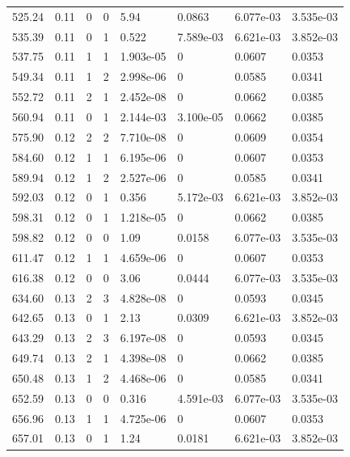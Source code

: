 \documentclass[preview]{standalone}
\begin{document}
{{{\begin{tabular}{L{1.2cm}C{1.2cm} C{0.3cm}C{0.5cm} C{1.4cm}C{1.4cm} C{1.4cm}C{1.4cm}}
  525.24  &  0.11  & 0     &  0 &  5.94  & 0.0863  & 6.077e-03 &  3.535e-03   \\ 
  535.39  &  0.11  & 0     &  1 &  0.522  & 7.589e-03  & 6.621e-03 &  3.852e-03   \\ 
  537.75  &  0.11  & 1     &  1 &  1.903e-05  & 0  & 0.0607 &  0.0353   \\ 
  549.34  &  0.11  & 1     &  2 &  2.998e-06  & 0  & 0.0585 &  0.0341   \\ 
  552.72  &  0.11  & 2     &  1 &  2.452e-08  & 0  & 0.0662 &  0.0385   \\ 
  560.94  &  0.11  & 0     &  1 &  2.144e-03  & 3.100e-05  & 0.0662 &  0.0385   \\ 
  575.90  &  0.12  & 2     &  2 &  7.710e-08  & 0  & 0.0609 &  0.0354   \\ 
  584.60  &  0.12  & 1     &  1 &  6.195e-06  & 0  & 0.0607 &  0.0353   \\ 
  589.94  &  0.12  & 1     &  2 &  2.527e-06  & 0  & 0.0585 &  0.0341   \\ 
  592.03  &  0.12  & 0     &  1 &  0.356  & 5.172e-03  & 6.621e-03 &  3.852e-03   \\ 
  598.31  &  0.12  & 0     &  1 &  1.218e-05  & 0  & 0.0662 &  0.0385   \\ 
  598.82  &  0.12  & 0     &  0 &  1.09  & 0.0158  & 6.077e-03 &  3.535e-03   \\ 
  611.47  &  0.12  & 1     &  1 &  4.659e-06  & 0  & 0.0607 &  0.0353   \\ 
  616.38  &  0.12  & 0     &  0 &  3.06  & 0.0444  & 6.077e-03 &  3.535e-03   \\ 
  634.60  &  0.13  & 2     &  3 &  4.828e-08  & 0  & 0.0593 &  0.0345   \\ 
  642.65  &  0.13  & 0     &  1 &  2.13  & 0.0309  & 6.621e-03 &  3.852e-03   \\ 
  643.29  &  0.13  & 2     &  3 &  6.197e-08  & 0  & 0.0593 &  0.0345   \\ 
  649.74  &  0.13  & 2     &  1 &  4.398e-08  & 0  & 0.0662 &  0.0385   \\ 
  650.48  &  0.13  & 1     &  2 &  4.468e-06  & 0  & 0.0585 &  0.0341   \\ 
  652.59  &  0.13  & 0     &  0 &  0.316  & 4.591e-03  & 6.077e-03 &  3.535e-03   \\ 
  656.96  &  0.13  & 1     &  1 &  4.725e-06  & 0  & 0.0607 &  0.0353   \\ 
  657.01  &  0.13  & 0     &  1 &  1.24  & 0.0181  & 6.621e-03 &  3.852e-03   \\ 

\end{tabular}}}}
\end{document}
